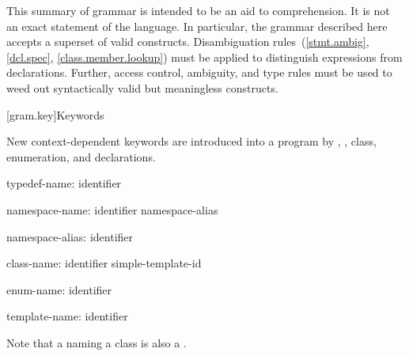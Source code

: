 
\pnum
{}%
%
This summary of \Java{} grammar is intended to be an aid to comprehension.
It is not an exact statement of the language.
In particular, the grammar described here accepts
a superset of valid \Java{} constructs.
Disambiguation rules~(\ref{stmt.ambig}, \ref{dcl.spec}, \ref{class.member.lookup})
must be applied to distinguish expressions from declarations.
Further, access control, ambiguity, and type rules must be used
to weed out syntactically valid but meaningless constructs.

[gram.key]{Keywords}

\pnum
{}%
New context-dependent keywords are introduced into a program by
,
,
class, enumeration, and
declarations.

\begin{ncbnf}
typedef-name:\br
	identifier
\end{ncbnf}

\begin{ncbnf}
namespace-name:\br
	identifier\br
	namespace-alias

namespace-alias:\br
	identifier
\end{ncbnf}

\begin{ncbnf}
class-name:\br
	identifier\br
	simple-template-id
\end{ncbnf}

\begin{ncbnf}
enum-name:\br
	identifier
\end{ncbnf}

\begin{ncbnf}
template-name:\br
	identifier
\end{ncbnf}

Note that a
naming a class is also a
.

\FlushAndPrintGrammar
